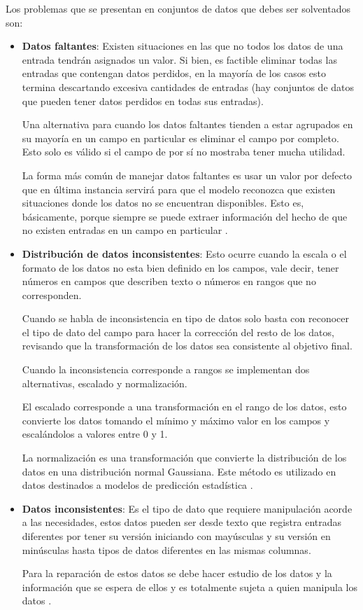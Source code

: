 \documentclass[letter,12pt]{report}
\begin{document}
Los problemas que se presentan en conjuntos de datos que debes ser solventados son:
\begin{itemize}
    \item \textbf{Datos faltantes}: Existen situaciones en las que no todos los datos de una
        entrada tendrán asignados un valor. Si bien, es factible eliminar todas las
        entradas que contengan datos perdidos, en la mayoría de los casos esto termina
        descartando excesiva cantidades de entradas (hay conjuntos de datos que pueden
        tener datos perdidos en todas sus entradas).

        Una alternativa para cuando los datos faltantes tienden a estar
        agrupados en su mayoría en un campo en particular es eliminar el campo
        por completo. Esto solo es válido si el campo de por sí no mostraba
        tener mucha utilidad.

        La forma más común de manejar datos faltantes es usar un valor por defecto que en
        última instancia servirá para que el modelo reconozca que existen situaciones
        donde los datos no se encuentran disponibles. Esto es, básicamente, porque siempre
        se puede extraer información del hecho de que no existen entradas en un campo en
        particular \cite{Miss}.
    \item \textbf{Distribución de datos inconsistentes}: Esto ocurre cuando la escala o
        el formato de los datos no esta bien definido en los campos, vale decir, tener
        números en campos que describen texto o números en rangos que no corresponden.

        Cuando se habla de inconsistencia en tipo de datos solo basta con reconocer el
        tipo de dato del campo para hacer la corrección del resto de los datos, revisando
        que la transformación de los datos sea consistente al objetivo final.

        Cuando la inconsistencia corresponde a rangos se implementan dos alternativas,
        escalado y normalización.

        El escalado corresponde a una transformación en el rango de los datos, esto
        convierte los datos tomando el mínimo y máximo valor en los campos y escalándolos
        a valores entre 0 y 1.

        La normalización es una transformación que convierte la distribución de los datos
        en una distribución normal Gaussiana. Este método es utilizado en datos
        destinados a modelos de predicción estadística \cite{Scal}.
    \item \textbf{Datos inconsistentes}: Es el tipo de dato que requiere manipulación
        acorde a las necesidades, estos datos pueden ser desde texto que registra
        entradas diferentes por tener su versión iniciando con mayúsculas y su versión en
        minúsculas hasta tipos de datos diferentes en las mismas columnas.

        Para la reparación de estos datos se debe hacer estudio de los datos y la
        información que se espera de ellos y es totalmente sujeta a quien manipula los
        datos \cite{Ingsoc}.
\end{itemize}
\end{document}

